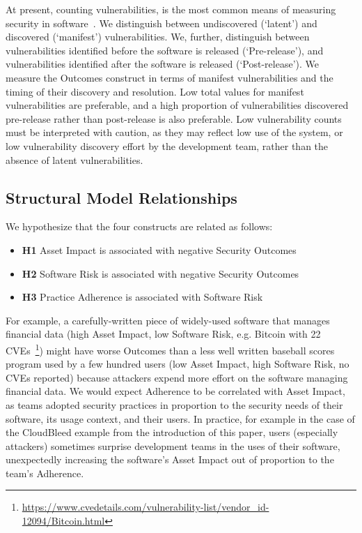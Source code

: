  At present, counting vulnerabilities, is the most common means of measuring security in software~\cite{morrison2014mapping}. We distinguish between undiscovered (`latent') and discovered (`manifest') vulnerabilities. We, further, distinguish between vulnerabilities identified before the software is released (`Pre-release'), and vulnerabilities identified after the software is released (`Post-release'). 
We measure the Outcomes construct in terms of manifest vulnerabilities and the timing of their discovery and resolution. Low total values for manifest vulnerabilities are preferable, and a high proportion of vulnerabilities discovered pre-release rather than post-release is also preferable. Low vulnerability counts must be interpreted with caution, as they may reflect low use of the system, or low vulnerability discovery effort by the development team, rather than the absence of latent vulnerabilities. 

\subsection{Structural Model Relationships}
We hypothesize that the four constructs are related as follows:
\begin{itemize}
	\item \textbf{H1} Asset Impact is associated with negative Security Outcomes
	\item \textbf{H2} Software Risk is associated with negative Security Outcomes
	\item \textbf{H3} Practice Adherence is associated with Software Risk 	
\end{itemize}

For example, a carefully-written piece of widely-used software that manages financial data (high Asset Impact, low Software Risk, e.g. Bitcoin with 22 CVEs~\footnote{\url{https://www.cvedetails.com/vulnerability-list/vendor_id-12094/Bitcoin.html}}) might have worse Outcomes than a less well written baseball scores program used by a few hundred users (low Asset Impact, high Software Risk, no CVEs reported) because attackers expend more effort on the software managing financial data. We would expect Adherence to be correlated with Asset Impact, as teams adopted security practices in proportion to the security needs of their software, its usage context, and their users. In practice, for example in the case of the CloudBleed example from the introduction of this paper, users (especially attackers) sometimes surprise development teams in the uses of their software, unexpectedly increasing the software's Asset Impact out of proportion to the team's Adherence. 



